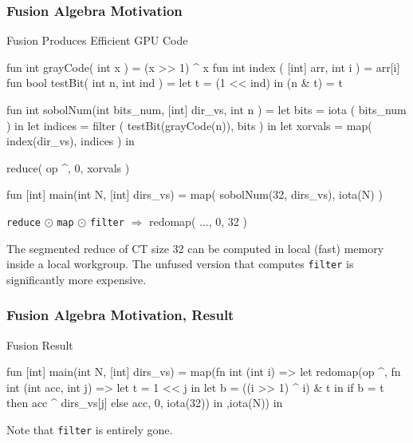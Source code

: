 \documentclass{beamer}
\newcommand{\emp}[1]{\textcolor{DikuRed}{ #1}}
\newcommand{\empr}[1]{\textcolor{CosRed}{ #1}}
\newcommand{\mymath}[1]{$ #1 $}
\begin{document}
\begin{frame}[fragile]
  \frametitle{Fusion Algebra Motivation}

\begin{block}{ Fusion Produces Efficient GPU Code}
\begin{colorcode}
fun int grayCode( int x            ) = (x >> 1) ^ x
fun int index   ( [int] arr, int i ) = arr[i]
fun bool testBit( int n,   int ind ) = let t = (1 << ind) in (n & t) = t

fun int sobolNum(int bits_num, [int] dir_vs, int n ) =
    let bits    = iota   ( bits_num )                   in
    let indices = \emp{filter} ( testBit(grayCode(n)), bits ) in
    let xorvals = \emp{map}( index(dir_vs), indices )         in

        \emp{reduce}( op ^, 0, xorvals )

fun [int] main(int N, [int] dirs_vs) =
    map( sobolNum(32, dirs_vs), iota(N) )
\end{colorcode}
\end{block}

{\tt reduce} \mymath{\odot} {\tt map} \mymath{\odot} {\tt filter} $\Rightarrow$ redomap( ..., 0, 32 )

\smallskip

The segmented reduce of CT size 32 can be computed in
local (fast) memory inside a local workgroup.
%
The unfused version that computes {\tt filter} is significantly more expensive.

\end{frame}

\begin{frame}[fragile]
\frametitle{Fusion Algebra Motivation, Result}

\begin{block}{Fusion Result}
\begin{colorcode}
fun [int] main(int N, [int] dirs_vs) =
  map(fn int (int i) => let
      redomap(op ^,
              fn int (int acc, int j) =>
                let t = 1 << j in
                let b = ((i >> 1) ^ i) & t in
                if b = t
                  then acc ^ dirs_vs[j]
                  else acc,
              \empr{0}, iota(32)) in
      ,iota(N)) in
\end{colorcode}
\end{block}

Note that {\tt filter} is entirely gone.
\end{frame}
\end{document}
